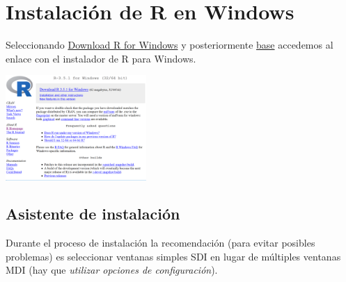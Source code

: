 \documentclass[
]{book}
\begin{document}
\section{Instalación de R en Windows}\label{instalaciuxf3n-de-r-en-windows}

Seleccionando \href{http://ftp.cixug.es/CRAN/bin/windows/}{Download R for Windows} y posteriormente
\href{http://ftp.cixug.es/CRAN/bin/windows/base/}{base} accedemos
al enlace con el instalador de R para Windows.

\includegraphics[width=0.4\textwidth,height=\textheight]{images/R351.png}

\subsection{Asistente de instalación}\label{asistente-de-instalaciuxf3n}

Durante el proceso de instalación la recomendación (para evitar posibles problemas) es seleccionar ventanas simples SDI en lugar de múltiples ventanas MDI (hay que \emph{utilizar opciones de configuración}).
\end{document}
